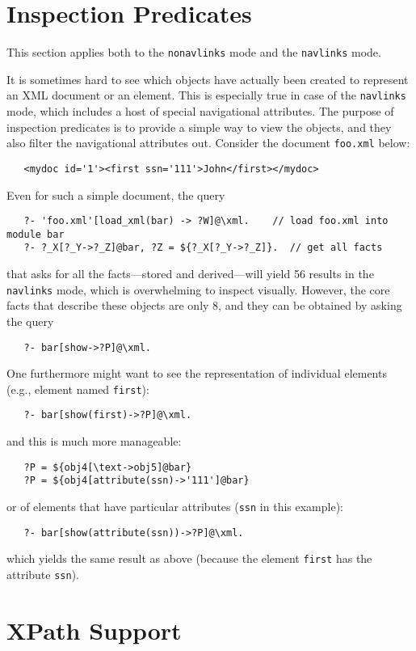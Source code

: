 \section{Inspection Predicates}

This section applies both to the \texttt{nonavlinks} mode and the
\texttt{navlinks} mode.  

It is sometimes hard to see which objects have actually been created to
represent an XML document or an element. This is especially true in case of
the \texttt{navlinks} mode, which includes a host of special navigational
attributes. 
The purpose of inspection predicates is to provide a simple way to view the
objects, and they also filter the navigational attributes out.
Consider the document \texttt{foo.xml} below: 
\begin{verbatim}
   <mydoc id='1'><first ssn='111'>John</first></mydoc>
\end{verbatim}
Even for such a simple document, the query
\begin{verbatim}
   ?- 'foo.xml'[load_xml(bar) -> ?W]@\xml.    // load foo.xml into module bar
   ?- ?_X[?_Y->?_Z]@bar, ?Z = ${?_X[?_Y->?_Z]}.  // get all facts
\end{verbatim}
that asks for all the facts---stored and derived---will yield 56 results in
the \texttt{navlinks} mode,
which is overwhelming to inspect visually. However, the core facts that
describe these objects are only 8, and they can be obtained by asking the
query
\begin{verbatim}
   ?- bar[show->?P]@\xml.
\end{verbatim}
One furthermore might want to see the representation of individual 
elements (e.g., element named \texttt{first}):
\begin{verbatim}
   ?- bar[show(first)->?P]@\xml.
\end{verbatim}
and this is much more manageable:
\begin{verbatim}
   ?P = ${obj4[\text->obj5]@bar}
   ?P = ${obj4[attribute(ssn)->'111']@bar}
\end{verbatim}
or of elements that have particular attributes (\texttt{ssn} in this
example): 
\begin{verbatim}
   ?- bar[show(attribute(ssn))->?P]@\xml.
\end{verbatim}
which yields the same result as above (because the element \texttt{first}
has the attribute \texttt{ssn}).  


\section{XPath Support}

